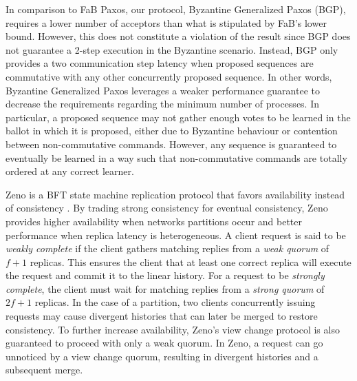 In comparison to FaB Paxos, our protocol, Byzantine Generalized Paxos (BGP), requires a lower number of acceptors than what is stipulated by FaB's lower bound. However, this does not constitute a violation of the result since BGP does not guarantee a 2-step execution in the Byzantine scenario. Instead, BGP only provides a two communication step latency when proposed sequences are commutative with any other concurrently proposed sequence. In other words, Byzantine Generalized Paxos leverages a weaker performance guarantee to decrease the requirements regarding the minimum number of processes. In particular, a proposed sequence may not gather enough votes to be learned in the ballot in which it is proposed, either due to Byzantine behaviour or contention between non-commutative commands. However, any sequence is guaranteed to eventually be learned in a way such that non-commutative commands are totally ordered at any correct learner.\par
Zeno is a BFT state machine replication protocol that favors availability instead of consistency \cite{Singh2009}. By trading strong consistency for eventual consistency, Zeno provides higher availability when networks partitions occur and better performance when replica latency is heterogeneous.  A client request is said to be \textit{weakly complete} if the client gathers matching replies from a \textit{weak quorum} of $f+1$ replicas. This ensures the client that at least one correct replica will execute the request and commit it to the linear history. For a request to be \textit{strongly complete}, the client must wait for matching replies from a \textit{strong quorum} of $2f+1$ replicas. In the case of a partition, two clients concurrently issuing requests may cause divergent histories that can later be merged to restore consistency. To further increase availability, Zeno's view change protocol is also guaranteed to proceed with only a weak quorum. In Zeno, a request can go unnoticed by a view change quorum, resulting in divergent histories and a subsequent merge.

